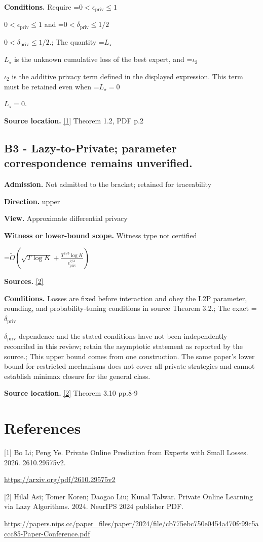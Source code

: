 \documentclass[10pt,a4paper]{article}
\newcommand{\AtlasMath}[1]{\par\begingroup\centering\setbox0=\hbox{$\displaystyle #1$}\ifdim\wd0>1.4\linewidth\typeout{ATLAS WIDE FORMULA: \the\wd0}\fi\ifdim\wd0>\linewidth\resizebox{\linewidth}{!}{\box0}\else\box0\fi\par\endgroup}
\newcommand{\AtlasInlineMath}[1]{\begingroup\setbox0=\hbox{$#1$}\ifdim\wd0>.4\linewidth\endgroup\AtlasMath{#1}\else\endgroup$#1$\fi}
\begin{document}
\textbf{Conditions.} Require \AtlasInlineMath{0<\epsilon_{\mathrm{priv}}\le1} and \AtlasInlineMath{0<\delta_{\mathrm{priv}}\le1/2}.; The quantity \AtlasInlineMath{L_\star} is the unknown cumulative loss of the best expert, and \AtlasInlineMath{\iota_2} is the additive privacy term defined in the displayed expression. This term must be retained even when \AtlasInlineMath{L_\star=0}.

\textbf{Source location.} \href{https://arxiv.org/pdf/2610.29575v2}{[1]} Theorem 1.2, PDF p.2

\subsection{B3 - Lazy-to-Private; parameter correspondence remains unverified.}
\textbf{Admission.} Not admitted to the bracket; retained for traceability

\textbf{Direction.} upper

\textbf{View.} Approximate differential privacy

\textbf{Witness or lower-bound scope.} Witness type not certified

\AtlasMath{\widetilde{O}\!\left(\sqrt{T\log K}+\frac{T^{1/3}\log K}{\epsilon_{\mathrm{priv}}^{2/3}}\right)}
\textbf{Sources.} \href{https://papers.nips.cc/paper_files/paper/2024/file/cb775ebc750e0454a470fc99c5accc85-Paper-Conference.pdf}{[2]}

\textbf{Conditions.} Losses are fixed before interaction and obey the L2P parameter, rounding, and probability-tuning conditions in source Theorem 3.2.; The exact \AtlasInlineMath{\delta_{\mathrm{priv}}} dependence and the stated conditions have not been independently reconciled in this review; retain the asymptotic statement as reported by the source.; This upper bound comes from one construction. The same paper's lower bound for restricted mechanisms does not cover all private strategies and cannot establish minimax closure for the general class.

\textbf{Source location.} \href{https://papers.nips.cc/paper_files/paper/2024/file/cb775ebc750e0454a470fc99c5accc85-Paper-Conference.pdf}{[2]} Theorem 3.10 pp.8-9

\section{References}
[1] Bo Li; Peng Ye. Private Online Prediction from Experts with Small Losses. 2026. 2610.29575v2.

\url{https://arxiv.org/pdf/2610.29575v2}

[2] Hilal Asi; Tomer Koren; Daogao Liu; Kunal Talwar. Private Online Learning via Lazy Algorithms. 2024. NeurIPS 2024 publisher PDF.

\url{https://papers.nips.cc/paper_files/paper/2024/file/cb775ebc750e0454a470fc99c5accc85-Paper-Conference.pdf}
\end{document}
